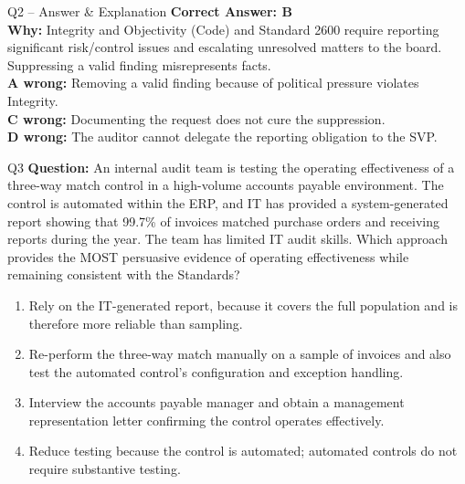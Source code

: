 \documentclass[aspectratio=169,10pt]{beamer}
\begin{document}
	\begin{frame}[t]{Q2 -- Answer \& Explanation}
		\small
		\textbf{Correct Answer: B} \\[4pt]
		\textbf{Why:} Integrity and Objectivity (Code) and Standard 2600 require reporting significant risk/control issues and escalating unresolved matters to the board. Suppressing a valid finding misrepresents facts. \\[4pt]
		\textbf{A wrong:} Removing a valid finding because of political pressure violates Integrity. \\[2pt]
		\textbf{C wrong:} Documenting the request does not cure the suppression. \\[2pt]
		\textbf{D wrong:} The auditor cannot delegate the reporting obligation to the SVP.
	\end{frame}
	
	\begin{frame}[t]{Q3}
		\small
		\textbf{Question:} An internal audit team is testing the operating effectiveness of a three-way match control in a high-volume accounts payable environment. The control is automated within the ERP, and IT has provided a system-generated report showing that 99.7\% of invoices matched purchase orders and receiving reports during the year. The team has limited IT audit skills. Which approach provides the MOST persuasive evidence of operating effectiveness while remaining consistent with the Standards?
		\begin{enumerate}[label=\Alph*.,itemsep=1pt,topsep=2pt]
			\item Rely on the IT-generated report, because it covers the full population and is therefore more reliable than sampling.
			\item Re-perform the three-way match manually on a sample of invoices and also test the automated control's configuration and exception handling.
			\item Interview the accounts payable manager and obtain a management representation letter confirming the control operates effectively.
			\item Reduce testing because the control is automated; automated controls do not require substantive testing.
		\end{enumerate}
	\end{frame}
	
\end{document}
